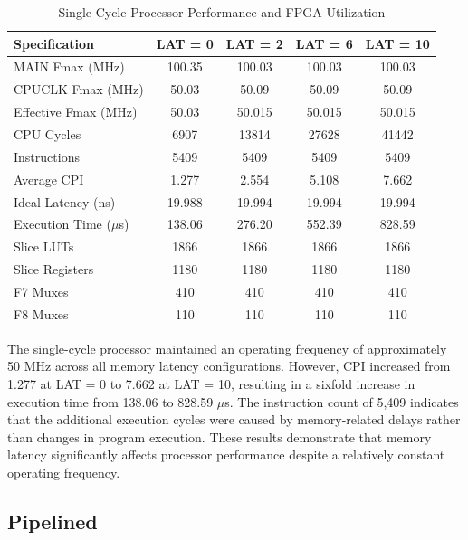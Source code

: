 \documentclass[12pt]{article}
\begin{document}
\begin{table}[H]
    \centering
    \small
    \begin{tabular}{|l|c|c|c|c|}
        \hline
        \textbf{Specification} &
        \textbf{LAT = 0} &
        \textbf{LAT = 2} &
        \textbf{LAT = 6} &
        \textbf{LAT = 10} \\ \hline

        MAIN Fmax (MHz) & 100.35 & 100.03 & 100.03 & 100.03 \\ \hline
        CPUCLK Fmax (MHz) & 50.03 & 50.09 & 50.09 & 50.09 \\ \hline
        Effective Fmax (MHz) & 50.03 & 50.015 & 50.015 & 50.015 \\ \hline
        CPU Cycles & 6907 & 13814 & 27628 & 41442 \\ \hline
        Instructions & 5409 & 5409 & 5409 & 5409 \\ \hline
        Average CPI & 1.277 & 2.554 & 5.108 & 7.662 \\ \hline
        Ideal Latency (ns) & 19.988 & 19.994 & 19.994 & 19.994 \\ \hline
        Execution Time ($\mu$s) & 138.06 & 276.20 & 552.39 & 828.59 \\ \hline
        Slice LUTs & 1866 & 1866 & 1866 & 1866 \\ \hline
        Slice Registers & 1180 & 1180 & 1180 & 1180 \\ \hline
        F7 Muxes & 410 & 410 & 410 & 410 \\ \hline
        F8 Muxes & 110 & 110 & 110 & 110 \\ \hline
    \end{tabular}
    \caption{Single-Cycle Processor Performance and FPGA Utilization}
    \label{tb:single_cycle_results}
\end{table}

The single-cycle processor maintained an operating frequency of approximately 50 MHz across all memory latency configurations. However, CPI increased from 1.277 at LAT = 0 to 7.662 at LAT = 10, resulting in a sixfold increase in execution time from 138.06 to 828.59 $\mu$s. The instruction count of 5,409 indicates that the additional execution cycles were caused by memory-related delays rather than changes in program execution. These results demonstrate that memory latency significantly affects processor performance despite a relatively constant operating frequency.

\subsection{Pipelined}
\end{document}
